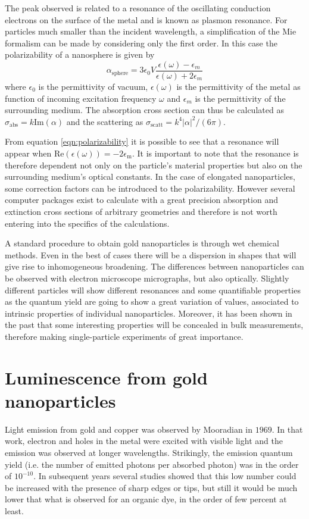 The peak observed is related to a resonance of the oscillating conduction
electrons on the surface of the metal and is known as plasmon resonance. For
particles much smaller than the incident wavelength, a simplification of the Mie
formalism can be made by considering only the first order. In this case the
polarizability of a nanosphere is given by
\begin{equation}\label{eqn:polarizability}
	\alpha_{\textrm{sphere}} =
	3\epsilon_0V\frac{\epsilon(\omega)-\epsilon_m}{\epsilon(\omega)+2\epsilon_m}
\end{equation}
where $\epsilon_0$ is the permittivity of vacuum, $\epsilon(\omega)$ is the
permittivity of the metal as function of incoming excitation frequency $\omega$
and $\epsilon_m$ is the permittivity of the surrounding medium. The absorption
cross section can thus be calculated as
$\sigma_\textrm{abs}=k\textrm{Im}(\alpha)$ and the scattering as
$\sigma_\textrm{scatt}=k^4|\alpha|^2/(6\pi)$.

From equation \ref{eqn:polarizability} it is possible to see that a resonance
will appear when $\textrm{Re}(\epsilon(\omega)) = -2\epsilon_\textrm{m}$. It is
important to note that the resonance is therefore dependent not only on the
particle's material properties but also on the surrounding medium's optical
constants. In the case of elongated nanoparticles, some correction factors can
be introduced to the polarizability. However several computer packages exist to
calculate with a great precision absorption and extinction cross sections of
arbitrary geometries and therefore is not worth entering into the specifics of
the calculations.

A standard procedure to obtain gold nanoparticles is through wet chemical
methods. Even in the best of cases there will be a dispersion in shapes that
will give rise to inhomogeneous broadening. The differences between
nanoparticles can be observed with electron microscope micrographs, but also
optically. Slightly different particles will show different resonances and some
quantifiable properties as the quantum yield are going to show a great variation
of values, associated to intrinsic properties of individual nanoparticles.
Moreover, it has been shown in the past that some interesting properties will be
concealed in bulk measurements, therefore making single-particle experiments of
great importance. 

\section{Luminescence from gold nanoparticles}
\label{sec:luminescence}
Light emission from gold and copper was observed by
Mooradian\cite{Mooradian1969} in $1969$. In that work, electron and holes in the
metal were excited with visible light and the emission was observed at longer
wavelengths. Strikingly, the emission quantum yield (i.e. the number of emitted
photons per absorbed photon) was in the order of $10^{-10}$. In subsequent years
several studies showed that this low number could be increased with the presence
of sharp edges or tips, but still it would be much lower that what is observed
for an organic dye, in the order of few percent at least. 

